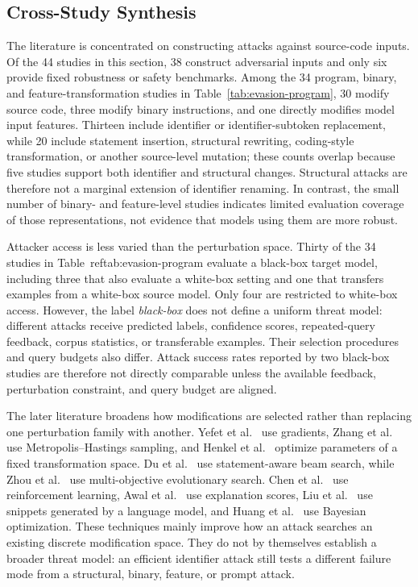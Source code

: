 \documentclass[acmsmall,screen,review]{acmart}
\begin{document}
\subsection{Cross-Study Synthesis}
\label{sec:evasion-synthesis}

The literature is concentrated on constructing attacks against source-code inputs. Of the 44 studies in this section, 38 construct adversarial inputs and only six provide fixed robustness or safety benchmarks. Among the 34 program, binary, and feature-transformation studies in Table~\ref{tab:evasion-program}, 30 modify source code, three modify binary instructions, and one directly modifies model input features. Thirteen include identifier or identifier-subtoken replacement, while 20 include statement insertion, structural rewriting, coding-style transformation, or another source-level mutation; these counts overlap because five studies support both identifier and structural changes. Structural attacks are therefore not a marginal extension of identifier renaming. In contrast, the small number of binary- and feature-level studies indicates limited evaluation coverage of those representations, not evidence that models using them are more robust.

Attacker access is less varied than the perturbation space. Thirty of the 34 studies in Table~ref{tab:evasion-program} evaluate a black-box target model, including three that also evaluate a white-box setting and one that transfers examples from a white-box source model. Only four are restricted to white-box access. However, the label \emph{black-box} does not define a uniform threat model: different attacks receive predicted labels, confidence scores, repeated-query feedback, corpus statistics, or transferable examples. Their selection procedures and query budgets also differ. Attack success rates reported by two black-box studies are therefore not directly comparable unless the available feedback, perturbation constraint, and query budget are aligned.

The later literature broadens how modifications are selected rather than replacing one perturbation family with another. Yefet et al.~\cite{yefet2020adversarial} use gradients, Zhang et al.~\cite{zhang2020generating} use Metropolis--Hastings sampling, and Henkel et al.~\cite{ramakrishnan2022semantic} optimize parameters of a fixed transformation space. Du et al.~\cite{gu2023beamattack} use statement-aware beam search, while Zhou et al.~\cite{moaa2024} use multi-objective evolutionary search. Chen et al.~\cite{rlattack2024} use reinforcement learning, Awal et al.~\cite{explainability2025} use explanation scores, Liu et al.~\cite{liu2024eatvul} use snippets generated by a language model, and Huang et al.~\cite{huang2025iterative} use Bayesian optimization. These techniques mainly improve how an attack searches an existing discrete modification space. They do not by themselves establish a broader threat model: an efficient identifier attack still tests a different failure mode from a structural, binary, feature, or prompt attack.
\end{document}

